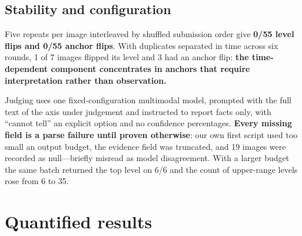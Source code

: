 \documentclass[11pt]{article}
\begin{document}
\subsection{Stability and configuration}

Five repeats per image interleaved by shuffled submission order give \textbf{0/55
level flips and 0/55 anchor flips}. With duplicates separated in time across six
rounds, 1 of 7 images flipped its level and 3 had an anchor flip: \textbf{the
time-dependent component concentrates in anchors that require interpretation rather
than observation.}

Judging uses one fixed-configuration multimodal model, prompted with the full text
of the axis under judgement and instructed to report facts only, with ``cannot
tell'' an explicit option and no confidence percentages. \textbf{Every missing field
is a parse failure until proven otherwise}: our own first script used too small an
output budget, the evidence field was truncated, and 19 images were recorded as
null---briefly misread as model disagreement. With a larger budget the same batch
returned the top level on 6/6 and the count of upper-range levels rose from 6 to 35.

\section{Quantified results}
\label{sec:quant}
\end{document}
